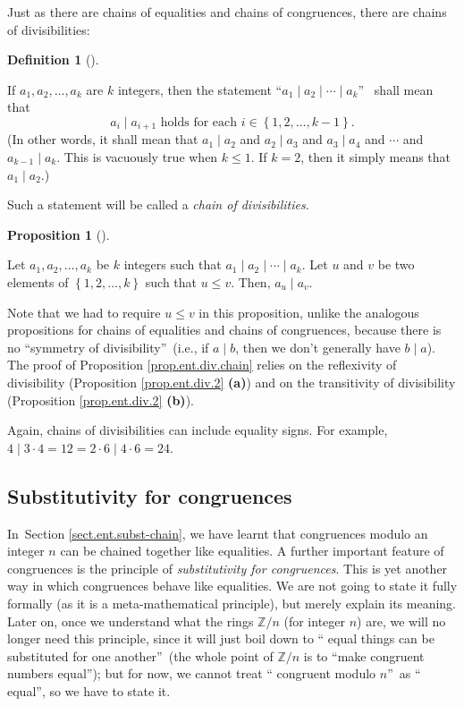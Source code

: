 \documentclass[numbers=enddot,12pt,final,onecolumn,notitlepage]{scrartcl}%
\numberwithin{exer}{subsection}
\theoremstyle{definition}
\newtheorem{prop}[theo]{Proposition}
\newenvironment{proposition}[1][]
{\begin{prop}[#1]\begin{leftbar}}
{\end{leftbar}\end{prop}}
\newtheorem{defi}[theo]{Definition}
\newenvironment{definition}[1][]
{\begin{defi}[#1]\begin{leftbar}}
{\end{leftbar}\end{defi}}
\begin{document}
Just as there are chains of equalities and chains of congruences, there are
chains of divisibilities:

\begin{definition}
If $a_{1},a_{2},\ldots,a_{k}$ are $k$ integers, then the statement
\textquotedblleft$a_{1}\mid a_{2}\mid\cdots\mid a_{k}$\textquotedblright%
\ shall mean that
\[
a_{i}\mid a_{i+1}\text{ holds for each }i\in\left\{  1,2,\ldots,k-1\right\}
.
\]
(In other words, it shall mean that $a_{1}\mid a_{2}$ and $a_{2}\mid a_{3}$
and $a_{3}\mid a_{4}$ and $\cdots$ and $a_{k-1}\mid a_{k}$. This is vacuously
true when $k\leq1$. If $k=2$, then it simply means that $a_{1}\mid a_{2}$.)

Such a statement will be called a \textit{chain of divisibilities}.
\end{definition}

\begin{proposition}
\label{prop.ent.div.chain}Let $a_{1},a_{2},\ldots,a_{k}$ be $k$ integers such
that $a_{1}\mid a_{2}\mid\cdots\mid a_{k}$. Let $u$ and $v$ be two elements of
$\left\{  1,2,\ldots,k\right\}  $ such that $u\leq v$. Then, $a_{u}\mid a_{v}$.
\end{proposition}

Note that we had to require $u\leq v$ in this proposition, unlike the
analogous propositions for chains of equalities and chains of congruences,
because there is no \textquotedblleft symmetry of
divisibility\textquotedblright\ (i.e., if $a\mid b$, then we don't generally
have $b\mid a$). The proof of Proposition \ref{prop.ent.div.chain} relies on
the reflexivity of divisibility (Proposition \ref{prop.ent.div.2}
\textbf{(a)}) and on the transitivity of divisibility (Proposition
\ref{prop.ent.div.2} \textbf{(b)}).

Again, chains of divisibilities can include equality signs. For example,
$4\mid3\cdot4=12=2\cdot6\mid4\cdot6=24$.

\subsection{\label{sect.ent.subst-mod}Substitutivity for congruences}

In\ Section \ref{sect.ent.subst-chain}, we have learnt that congruences modulo
an integer $n$ can be chained together like equalities. A further important
feature of congruences is the principle of \textit{substitutivity for
congruences}. This is yet another way in which congruences behave like
equalities. We are not going to state it fully formally (as it is a
meta-mathematical principle), but merely explain its meaning. Later on, once
we understand what the rings $\mathbb{Z}/n$ (for integer $n$) are, we will no
longer need this principle, since it will just boil down to \textquotedblleft
equal things can be substituted for one another\textquotedblright\ (the whole
point of $\mathbb{Z}/n$ is to \textquotedblleft make congruent numbers
equal\textquotedblright); but for now, we cannot treat \textquotedblleft
congruent modulo $n$\textquotedblright\ as \textquotedblleft
equal\textquotedblright, so we have to state it.
\end{document}
